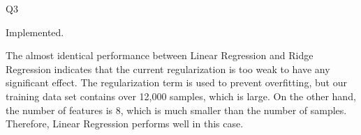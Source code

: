\question Q3\droppoints

\begin{solution}
     Implemented.

     The almost identical performance between Linear Regression and Ridge Regression indicates that the current regularization is too weak to have any significant effect.
    The regularization term is used to prevent overfitting, but our training data set contains over 12,000 samples, which is large.
    On the other hand, the number of features is 8, which is much smaller than the number of samples.
    Therefore, Linear Regression performs well in this case.
\end{solution}